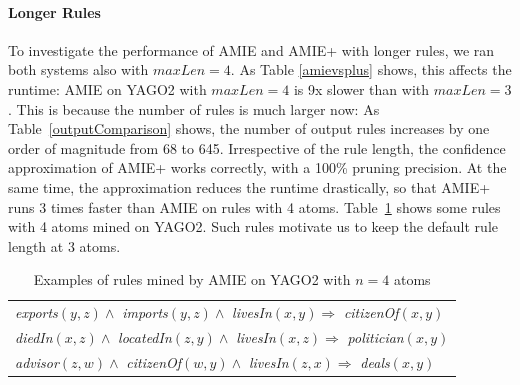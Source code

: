 \paragraph{Longer Rules}
To investigate the performance of AMIE and AMIE+ with longer rules, we ran both systems also with $maxLen=4$. As Table \ref{amievsplus} shows, this affects the runtime: AMIE on YAGO2 with $maxLen=4$ is 9x slower than with $maxLen=3$. This is because the number of rules is much larger now: As Table~\ref{outputComparison} shows, the number of output rules increases by one order of magnitude from 68 to 645.
Irrespective of the rule length, the confidence approximation of AMIE+ works correctly, with a 100\% pruning precision. At the same time, the approximation reduces the runtime drastically, so that AMIE+ runs 3 times faster than AMIE on rules with 4 atoms. Table~\ref{rules4atoms} shows some rules with 4 atoms mined on YAGO2. Such rules motivate us to keep the default rule length at 3 atoms.

\begin{table}
\hspace*{-2.4ex}
\begin{tabular}{|l|}
\hline
\emph{exports}$(y,z) \wedge$ \emph{imports}$(y,z) \wedge$ \emph{livesIn}$(x,y) \Rightarrow $ \emph{citizenOf}$(x,y)$\\
\emph{diedIn}$(x,z) \wedge$ \emph{locatedIn}$(z,y) \wedge$ \emph{livesIn}$(x,z) \Rightarrow $ \emph{politician}$(x,y)$\\
\emph{advisor}$(z,w) \wedge$ \emph{citizenOf}$(w,y) \wedge$ \emph{livesIn}$(z,x) \Rightarrow $ \emph{deals}$(x,y)$ \\
\hline
\end{tabular}
\caption{Examples of rules mined by AMIE on YAGO2 with $n=4$ atoms}\label{rules4atoms}
\end{table}


